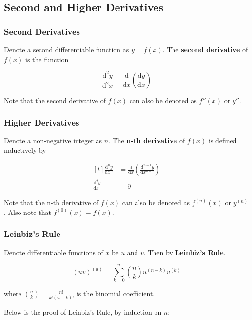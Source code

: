 \documentclass[a4paper,12pt]{article}
\newcommand{\s}{\vspace{1mm}}
\newcommand{\n}{\vspace{3mm}}
\newcommand{\diff}{\mathrm{d}}
\begin{document}
\subsection{Second and Higher Derivatives}
\subsubsection{Second Derivatives}
Denote a second differentiable function as $y=f(x)$. The \textbf{second derivative} of $f(x)$ is the function

$$\frac{\diff ^2 y}{\diff ^2 x}=\frac{\diff }{\diff  x}(\frac{\diff  y}{\diff  x})$$\s

Note that the second derivative of $f(x)$ can also be denoted as $f''(x)$ or $y''$.

\subsubsection{Higher Derivatives}
Denote a non-negative integer as $n$. The \textbf{n-th derivative} of $f(x)$ is defined inductively by

$$\begin{aligned}[t]
  \frac{\diff ^{n} y}{\diff  x^{n}}&=\frac{\diff }{\diff  x}(\frac{\diff ^{n-1} y}{\diff  x^{n-1}})\\
  \frac{\diff ^{0} y}{\diff  x^{0}}&=y
\end{aligned}$$\s

Note that the n-th derivative of $f(x)$ can also be denoted as $f^{(n)}(x)$ or $y^{(n)}$. Also note that $f^{(0)}(x)=f(x)$.

\subsubsection{Leinbiz's Rule}
Denote differentiable functions of $x$ be $u$ and $v$. Then by \textbf{Leinbiz's Rule},

$$(uv)^{(n)}=\sum_{k=0}^{n}\binom{n}{k}u^{(n-k)}v^{(k)}$$\s

where $\binom{n}{k}=\frac{n!}{k!(n-k)!}$ is the binomial coefficient.\n

Below is the proof of Leinbiz's Rule, by induction on $n$:\n
\end{document}
